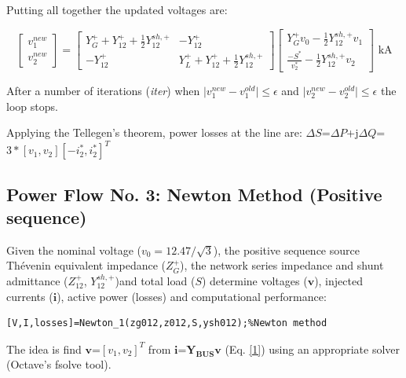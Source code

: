 \documentclass[12pt]{article}
\begin{document}
Putting all together the updated voltages are:

\begin{equation}
\begin{bmatrix}
	{v}^{new}_1\\
	{v}^{new}_2
\end{bmatrix}=
 \left[ \begin{array}{cc}
               {Y}^{+}_{G}+{Y}^{+}_{12}+\frac{
1}{2}{Y}^{sh,+}_{12} &-{Y}^{+}_{12} \\
              -{Y}^{+}_{12}  & {Y}^{+}_{L}+{Y}^{+}_{12}+\frac{
1}{2}{Y}^{sh,+}_{12}
             \end{array}
           \right]
  \begin{bmatrix}
  {Y}^{+}_{G}v_0-\frac{1}{2}{Y}^{sh,+}_{12}v_1\\
  \frac{-{S}^*}{{v}^*_2}-\frac{1}{2}{Y}^{sh,+}_{12}v_2\end{bmatrix}
    \mbox{ kA}
\end{equation}

After a number of iterations (\textit{iter}) when  $\mid{v}^{new}_1-{v}^{old}_1\mid\leq \epsilon$ and $\mid{v}^{new}_2-{v}^{old}_2\mid\leq \epsilon$ the loop stops.

Applying the Tellegen's theorem, power losses at the line are: $\Delta {S}$=$\Delta P$+j$\Delta Q$=$3*[{v}_1,{v}_2][-{i}^*_2,{i}^*_2]^T$

\subsection{Power Flow No. 3: Newton Method (Positive sequence)}

Given the nominal voltage ($v_0=12.47/\sqrt{3}$), the positive sequence source Th\'evenin equivalent impedance (${Z}^{+}_{G}$), the network series impedance and shunt admittance (${Z}^{+}_{12}$, ${Y}^{sh,+}_{12}$)and total load (${S}$)
determine voltages ($\bm{v}$), injected currents ($\mathbf{i}$), active power (losses) and computational performance:

\begin{verbatim}
[V,I,losses]=Newton_1(zg012,z012,S,ysh012);%Newton method
\end{verbatim}

The idea is find $\bm{v}$=$[{v}_1,{v}_2]^T$ from $\bm{i}$=$\mathbf{Y_{BUS}}\bm{v}$ (Eq. \ref{1}) using an appropriate solver (Octave's {fsolve} tool).
\end{document}
